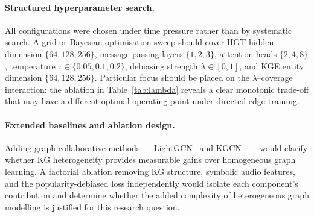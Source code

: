 \paragraph{Structured hyperparameter search.}
All configurations were chosen under time pressure rather than by systematic search. A grid or Bayesian optimisation sweep should cover HGT hidden dimension $\{64, 128, 256\}$, message-passing layers $\{1, 2, 3\}$, attention heads $\{2, 4, 8\}$, temperature $\tau \in \{0.05, 0.1, 0.2\}$, debiasing strength $\lambda \in [0, 1]$, and KGE entity dimension $\{64, 128, 256\}$. Particular focus should be placed on the $\lambda$--coverage interaction: the ablation in Table~\ref{tab:lambda} reveals a clear monotonic trade-off that may have a different optimal operating point under directed-edge training.

\paragraph{Extended baselines and ablation design.}
Adding graph-collaborative methods — LightGCN~\cite{he2020lightgcn} and KGCN~\cite{wang2019kgcn} — would clarify whether KG heterogeneity provides measurable gains over homogeneous graph learning. A factorial ablation removing KG structure, symbolic audio features, and the popularity-debiased loss independently would isolate each component's contribution and determine whether the added complexity of heterogeneous graph modelling is justified for this research question.
